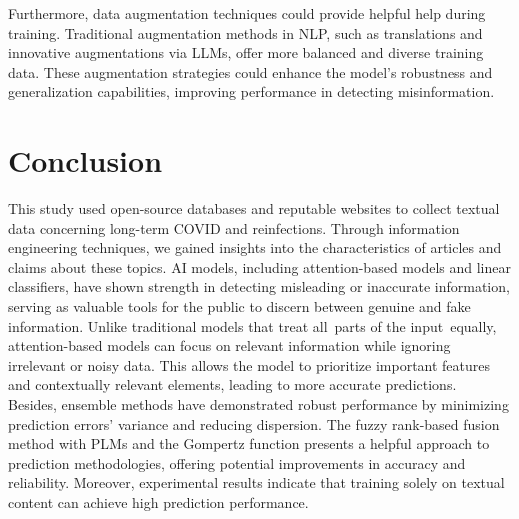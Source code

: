 Furthermore, data augmentation techniques could provide helpful help during training. Traditional augmentation methods in NLP, such as translations\cite{b38} and innovative augmentations via LLMs\cite{b39}, offer more balanced and diverse training data. These augmentation strategies could enhance the model's robustness and generalization capabilities, improving performance in detecting misinformation.

\section{Conclusion}
This study used open-source databases and reputable websites to collect textual data concerning long-term COVID and reinfections. Through information engineering techniques, we gained insights into the characteristics of articles and claims about these topics. AI models, including attention-based models and linear classifiers, have shown strength in detecting misleading or inaccurate information, serving as valuable tools for the public to discern between genuine and fake information. Unlike traditional models that treat all parts of the input equally, attention-based models can focus on relevant information while ignoring irrelevant or noisy data. This allows the model to prioritize important features and contextually relevant elements, leading to more accurate predictions. \\

Besides, ensemble methods have demonstrated robust performance by minimizing prediction errors' variance and reducing dispersion. The fuzzy rank-based fusion method with PLMs and the Gompertz function presents a helpful approach to prediction methodologies, offering potential improvements in accuracy and reliability. Moreover, experimental results indicate that training solely on textual content can achieve high prediction performance.
